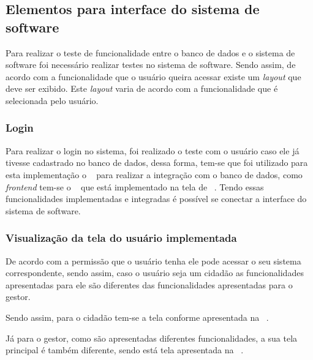 %



\subsection{Elementos para interface do sistema de software}

Para realizar o teste de funcionalidade entre o banco de dados e o sistema de software foi necessário realizar testes no sistema de software. Sendo assim, de acordo com a funcionalidade que o usuário queira acessar existe um \emph{layout} que deve ser exibido. Este \emph{layout} varia de acordo com a funcionalidade que é selecionada pelo usuário.

\subsubsection{Login}

Para realizar o login no sistema, foi realizado o teste com o usuário caso ele já tivesse cadastrado no banco de dados, dessa forma, tem-se que foi utilizado para esta implementação o ~ para realizar a integração com o banco de dados, como \emph{frontend} tem-se o ~ que está implementado na tela de ~. Tendo essas funcionalidades implementadas e integradas é possível se conectar a interface do sistema de software.


\subsubsection{Visualização da tela do usuário implementada}

De acordo com a permissão que o usuário tenha ele pode acessar o seu sistema correspondente, sendo assim, caso o usuário seja um cidadão as funcionalidades apresentadas para ele são diferentes das funcionalidades apresentadas para o gestor.


%

Sendo assim, para o cidadão tem-se a tela conforme apresentada na ~.


%

Já para o gestor, como são apresentadas diferentes funcionalidades, a sua tela principal é também diferente, sendo está tela apresentada na ~.


